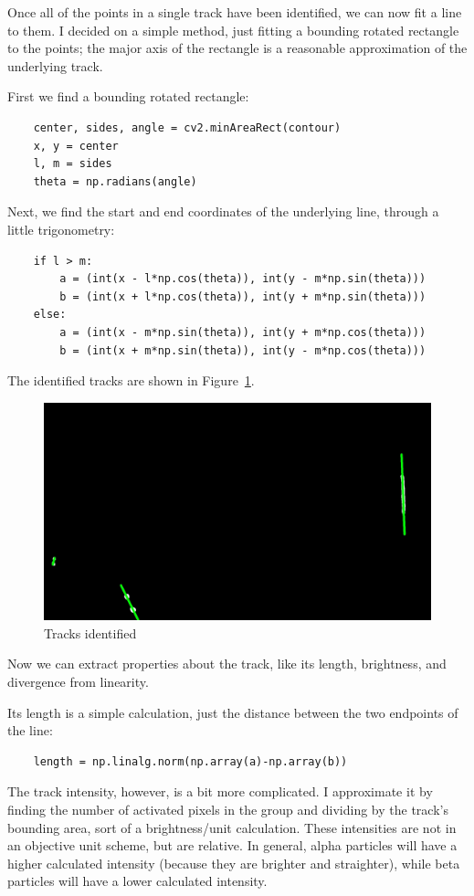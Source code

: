 \documentclass[notitlepage]{article}
\begin{document}
Once all of the points in a single track have been identified, we can now fit a line to them.  I decided on a simple method, just fitting a bounding rotated rectangle to the points; the major axis of the rectangle is a reasonable approximation of the underlying track.

First we find a bounding rotated rectangle:
\begin{lstlisting}
    center, sides, angle = cv2.minAreaRect(contour)
    x, y = center
    l, m = sides
    theta = np.radians(angle)
\end{lstlisting}

Next, we find the start and end coordinates of the underlying line, through a little trigonometry:
\begin{lstlisting}
    if l > m:
        a = (int(x - l*np.cos(theta)), int(y - m*np.sin(theta)))
        b = (int(x + l*np.cos(theta)), int(y + m*np.sin(theta)))
    else:
        a = (int(x - m*np.sin(theta)), int(y + m*np.cos(theta)))
        b = (int(x + m*np.sin(theta)), int(y - m*np.cos(theta)))
\end{lstlisting}

The identified tracks are shown in Figure~\ref{fig:mask5}.

\begin{figure}[h]
	\centering
	\includegraphics[width=.45\textwidth]{mask5}
	\caption{Tracks identified\label{fig:mask5}}
\end{figure}

Now we can extract properties about the track, like its length, brightness, and divergence from linearity.

Its length is a simple calculation, just the distance between the two endpoints of the line:
\begin{lstlisting}
    length = np.linalg.norm(np.array(a)-np.array(b))
\end{lstlisting}    

The track intensity, however, is a bit more complicated.  I approximate it by finding the number of activated pixels in the group and dividing by the track's bounding area, sort of a brightness/unit calculation.  These intensities are not in an objective unit scheme, but are relative.  In general, alpha particles will have a higher calculated intensity (because they are brighter and straighter), while beta particles will have a lower calculated intensity.
\end{document}
